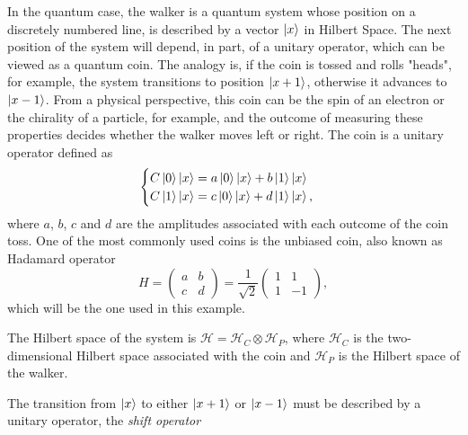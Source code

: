 \documentclass[../../dissertation.tex]{subfiles}
\begin{document}
In the quantum case, the walker is a quantum system whose position on a discretely numbered line, is described by a vector $\ket{x}$ in Hilbert Space. The next position of the system will depend, in part, of a unitary operator, which can be viewed as a quantum coin.
The analogy is, if the coin is tossed and rolls "heads", for example, the system transitions to position $\ket{x+1}$, otherwise it advances to $\ket{x-1}$. From a physical perspective, this coin can be the spin of an electron or the chirality of a particle, for example, and the outcome of measuring these properties decides whether the walker moves left or right. The coin is a unitary operator defined as
\begin{equation}
	\begin{cases}
		C\ket{0}\ket{x} = a\ket{0}\ket{x} + b\ket{1}\ket{x}\\
		C\ket{1}\ket{x} = c\ket{0}\ket{x} + d\ket{1}\ket{x},
	\end{cases}
\end{equation}
where $a$, $b$, $c$ and $d$ are the amplitudes associated with each outcome of the coin toss. One of the most commonly used coins is the unbiased coin, also known as Hadamard operator
\begin{equation}
	H = \begin{pmatrix} 
		a & b\\
		c & d
	    \end{pmatrix}
	    =\frac{1}{\sqrt{2}} \begin{pmatrix}
			    		1 & 1\\
					1 & -1
	   		       \end{pmatrix},
\end{equation}
which will be the one used in this example.\par 
The Hilbert space of the system is $\mathscr{H} = \mathscr{H}_{C} \otimes \mathscr{H}_{P}$, where $\mathscr{H}_{C}$ is the two-dimensional Hilbert space associated with the coin and $\mathscr{H}_P$ is the Hilbert space of the walker.\par
The transition from $\ket{x}$ to either $\ket{x+1}$ or $\ket{x-1}$ must be described by a unitary operator, the \textit{shift operator} 
\end{document}
